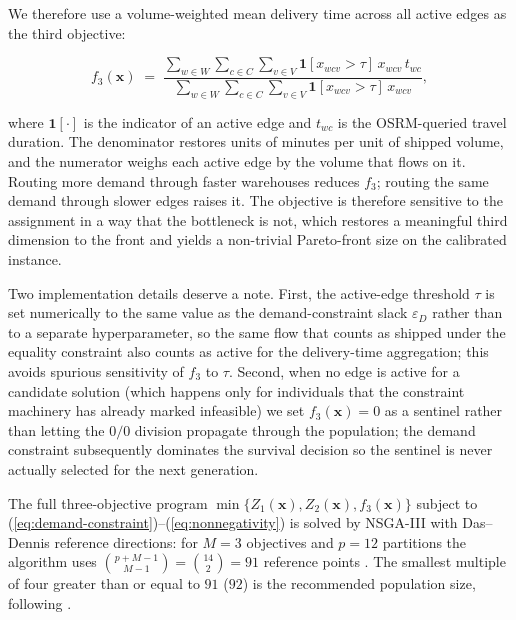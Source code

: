\documentclass[review,preprint,authoryear,12pt]{elsarticle}
\begin{document}
We therefore use a volume-weighted mean delivery time across all
active edges as the third objective:

\begin{equation}
f_3(\mathbf{x}) \;=\;
\frac{
\displaystyle
\sum_{w \in W} \sum_{c \in C} \sum_{v \in V}
\mathbf{1}[x_{wcv} > \tau] \, x_{wcv} \, t_{wc}
}{
\displaystyle
\sum_{w \in W} \sum_{c \in C} \sum_{v \in V}
\mathbf{1}[x_{wcv} > \tau] \, x_{wcv}
},
\label{eq:f3-volume-weighted}
\end{equation}

where $\mathbf{1}[\cdot]$ is the indicator of an active edge and
$t_{wc}$ is the OSRM-queried travel duration. The denominator
restores units of minutes per unit of shipped volume, and the
numerator weighs each active edge by the volume that flows on it.
Routing more demand through faster warehouses reduces $f_3$; routing
the same demand through slower edges raises it. The objective is
therefore sensitive to the assignment in a way that the bottleneck
is not, which restores a meaningful third dimension to the front and
yields a non-trivial Pareto-front size on the calibrated instance.

Two implementation details deserve a note. First, the active-edge
threshold $\tau$ is set numerically to the same value as the
demand-constraint slack $\varepsilon_D$ rather than to a separate
hyperparameter, so the same flow that counts as shipped under the
equality constraint also counts as active for the delivery-time
aggregation; this avoids spurious sensitivity of $f_3$ to $\tau$.
Second, when no edge is active for a candidate solution (which
happens only for individuals that the constraint machinery has
already marked infeasible) we set $f_3(\mathbf{x}) = 0$ as a
sentinel rather than letting the $0/0$ division propagate through
the population; the demand constraint subsequently dominates the
survival decision so the sentinel is never actually selected for the
next generation.

The full three-objective program $\min \{Z_1(\mathbf{x}),
Z_2(\mathbf{x}), f_3(\mathbf{x})\}$ subject to
(\ref{eq:demand-constraint})--(\ref{eq:nonnegativity}) is solved by
NSGA-III with Das--Dennis reference directions: for $M = 3$
objectives and $p = 12$ partitions the algorithm uses
$\binom{p + M - 1}{M - 1} = \binom{14}{2} = 91$ reference points
\citep{dasdennis1998nbi, debjain2014nsga3}. The smallest multiple of
four greater than or equal to $91$ ($92$) is the recommended
population size, following \citet[Table~I]{debjain2014nsga3}.
\end{document}
